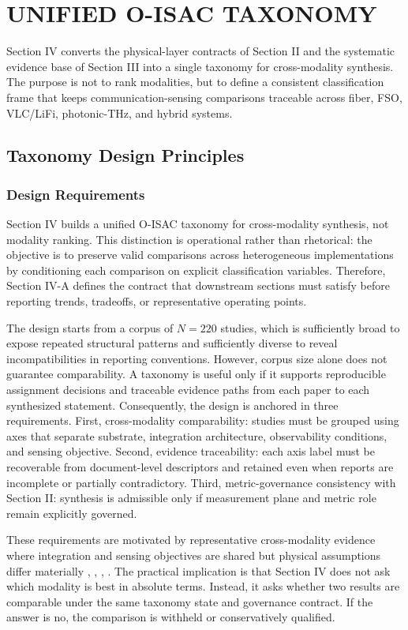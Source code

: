 \section{UNIFIED O-ISAC TAXONOMY}

Section IV converts the physical-layer contracts of Section II and the systematic evidence base of Section III into a single taxonomy for cross-modality synthesis. The purpose is not to rank modalities, but to define a consistent classification frame that keeps communication-sensing comparisons traceable across fiber, FSO, VLC/LiFi, photonic-THz, and hybrid systems.

\subsection{Taxonomy Design Principles}

\subsubsection{Design Requirements}
Section IV builds a unified O-ISAC taxonomy for cross-modality synthesis, not modality ranking. This distinction is operational rather than rhetorical: the objective is to preserve valid comparisons across heterogeneous implementations by conditioning each comparison on explicit classification variables. Therefore, Section IV-A defines the contract that downstream sections must satisfy before reporting trends, tradeoffs, or representative operating points.

The design starts from a corpus of $N=220$ studies, which is sufficiently broad to expose repeated structural patterns and sufficiently diverse to reveal incompatibilities in reporting conventions. However, corpus size alone does not guarantee comparability. A taxonomy is useful only if it supports reproducible assignment decisions and traceable evidence paths from each paper to each synthesized statement. Consequently, the design is anchored in three requirements. First, cross-modality comparability: studies must be grouped using axes that separate substrate, integration architecture, observability conditions, and sensing objective. Second, evidence traceability: each axis label must be recoverable from document-level descriptors and retained even when reports are incomplete or partially contradictory. Third, metric-governance consistency with Section II: synthesis is admissible only if measurement plane and metric role remain explicitly governed.

These requirements are motivated by representative cross-modality evidence where integration and sensing objectives are shared but physical assumptions differ materially \cite{O_ISAC_006}, \cite{O_ISAC_021}, \cite{O_ISAC_068}, \cite{O_ISAC_016}. The practical implication is that Section IV does not ask which modality is best in absolute terms. Instead, it asks whether two results are comparable under the same taxonomy state and governance contract. If the answer is no, the comparison is withheld or conservatively qualified.

